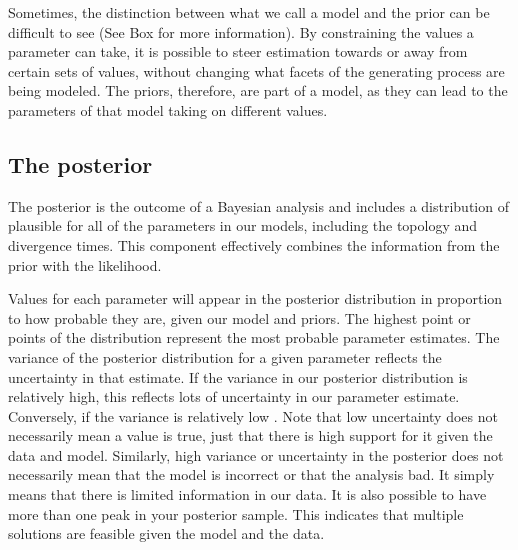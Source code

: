 Sometimes, the distinction between what we call a model and the prior can be difficult to see (See Box  for more information).
By constraining the values a parameter can take, it is possible to steer estimation towards or away from certain sets of values, without changing what facets of the generating process are being modeled.
The priors, therefore, are part of a model, as they can lead to the parameters of that model taking on different values.

\subsection{The posterior}

The posterior is the outcome of a Bayesian analysis and includes a distribution of plausible  for all of the  parameters  in our models, including the  topology and divergence times.
This component effectively combines the information from the prior with the likelihood. 

Values for each parameter will appear in the posterior distribution in proportion to how probable they are, given our model and priors.
The highest point or points of the distribution represent the most probable parameter estimates.
The variance of the posterior distribution for a given parameter reflects the uncertainty in that estimate.
If the variance in our posterior distribution is relatively high, this reflects lots of uncertainty in our parameter estimate.
Conversely, if the variance is relatively low .
Note that low uncertainty does not necessarily mean a value is true, just that there is high support for it given the data and model.
Similarly, high variance or uncertainty in the posterior does not necessarily mean that the model is incorrect or that the analysis  bad. It simply means that there is limited information in our data.
It is also possible to have more than one peak in your posterior sample.
This indicates that multiple solutions are feasible given the model and the data.

